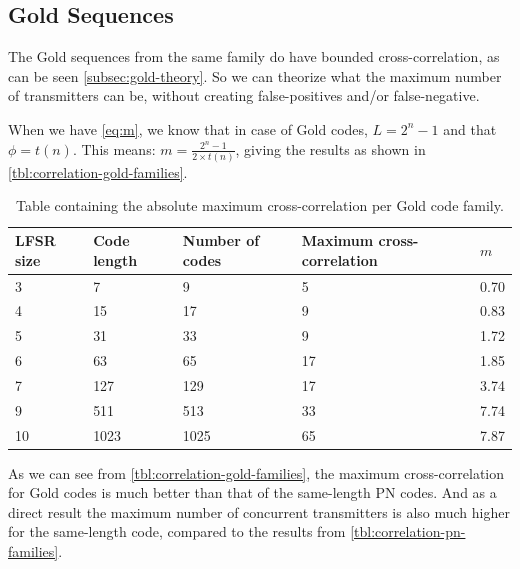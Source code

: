 	\subsection{Gold Sequences}
	\label{subsec:enc-dec-theory-gold}


		The Gold sequences from the same family do have bounded cross-correlation, as can be seen \autoref{subsec:gold-theory}.
		So we can theorize what the maximum number of transmitters can be, without creating false-positives and/or false-negative.

		When we have \autoref{eq:m}, we know that in case of Gold codes, $L = 2^n - 1$ and that $\phi = t(n)$.
		This means: $m = \frac{2^n - 1}{2 \times t(n)}$, giving the results as shown in \autoref{tbl:correlation-gold-families}.


		\begin{table}[h]
			\centering
			\begin{tabular}{ | l | l | l | l | l | }

				\hline
				LFSR size 	& Code length	& Number of codes 	& Maximum cross-correlation & $m$	\\ \hline

				3			& 7				& 9					& 5							& 0.70	\\ \hline
				4			& 15			& 17				& 9							& 0.83	\\ \hline
				5			& 31			& 33				& 9							& 1.72	\\ \hline
				6			& 63			& 65				& 17						& 1.85	\\ \hline
				7			& 127			& 129				& 17						& 3.74	\\ \hline
				9			& 511			& 513				& 33						& 7.74	\\ \hline
				10			& 1023			& 1025				& 65						& 7.87	\\ \hline	
				

			\end{tabular}
			\caption{Table containing the absolute maximum cross-correlation per Gold code family.}
			\label{tbl:correlation-gold-families}
		\end{table}

		As we can see from \autoref{tbl:correlation-gold-families}, the maximum cross-correlation for Gold codes is much better than that of the same-length PN codes.
		And as a direct result the maximum number of concurrent transmitters is also much higher for the same-length code, compared to the results from \autoref{tbl:correlation-pn-families}.

